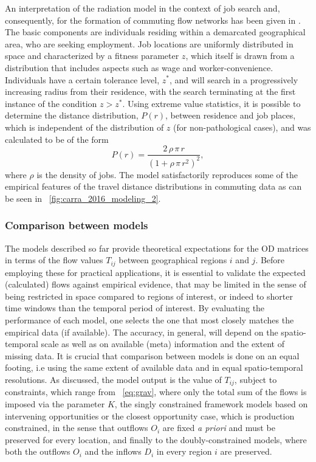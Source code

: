 An interpretation of the radiation model 
in the context of job search and, consequently, for the formation of commuting flow networks has been given in \cite{carra_2016_modeling}. 
The basic components are individuals residing within a demarcated geographical area, who are seeking employment. Job locations are uniformly distributed in space and characterized by a fitness parameter $z$, which itself is drawn from a distribution that includes aspects such as wage and worker-convenience. Individuals have a certain tolerance level, $z^{\ast}$, and will search in a progressively increasing radius from their residence, with the search terminating at the first instance of the condition $z >  z^{\ast}$. Using extreme value statistics, it is possible to determine the distance distribution, $P(r)$, between residence and job places, which is independent of the distribution of $z$ (for non-pathological cases), and was calculated to be of the form 
\begin{equation}
P(r) = \frac{2\, \rho\, \pi\, r}{(1+ \rho\, \pi \, r^2)^2} ,
\end{equation}
where $\rho$ is the density of jobs. The model satisfactorily reproduces some of the empirical features of the travel distance distributions in commuting data as can be seen in \figurename~\ref{fig:carra_2016_modeling_2}.     


\subsubsection{Comparison between models}
\label{sec:comparison}

The models described so far provide theoretical expectations for the OD matrices in terms of the flow values $T_{ij}$ between geographical regions $i$ and $j$. Before employing these for practical applications, it is essential to validate the expected (calculated) flows against empirical evidence, that may be limited in the sense of being restricted in space compared to regions of interest, or indeed to shorter time windows than the temporal period of interest. By evaluating the performance of each model, one selects %
the one that most closely matches the empirical data (if available). The accuracy, in general, will depend on the spatio-temporal scale as well as on available (meta) information and the extent of missing data. It is crucial that comparison between models is done on an equal footing, i.e using the same extent of available data and in equal spatio-temporal resolutions. As discussed, the model output is the value of $T_{ij}$, subject to constraints, which range from \equationname~\eqref{eq:grav}, where only the total sum of the flows is imposed via the parameter $K$, the singly constrained framework models based on intervening opportunities or the closest opportunity case, which is production constrained, in the sense that outflows $O_i$ are fixed \emph{ a priori} and must be preserved for every location, and finally to the doubly-constrained models, where both the outflows $O_i$  and the inflows $D_i$ in every region $i$ are preserved. 


